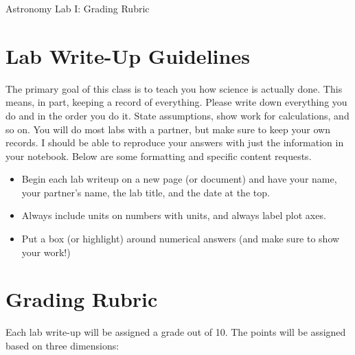 \documentclass[10pt]{article}
\begin{document}
\begin{center}
{\huge Astronomy Lab I: Grading Rubric}\\
\medskip
\end{center}

\bigskip

\section{Lab Write-Up Guidelines}

The primary goal of this class is to teach you how science is actually done. This means, in part, keeping a record of everything. Please write down everything you do and in the order you do it. State assumptions, show work for calculations, and so on. You will do most labs with a partner, but make sure to keep your own records. I should be able to reproduce your answers with just the information in your notebook. Below are some formatting and specific content requests.

\begin{itemize}
\item Begin each lab writeup on a new page (or document) and have your name, your partner's name, the lab title, and the date at the top.
\item Always include units on numbers with units, and always label plot axes.
\item Put a box (or highlight) around numerical answers (and make sure to show your work!)
\end{itemize}

\section{Grading Rubric}

Each lab write-up will be assigned a grade out of 10. The points will be assigned based on three dimensions:
\end{document}
